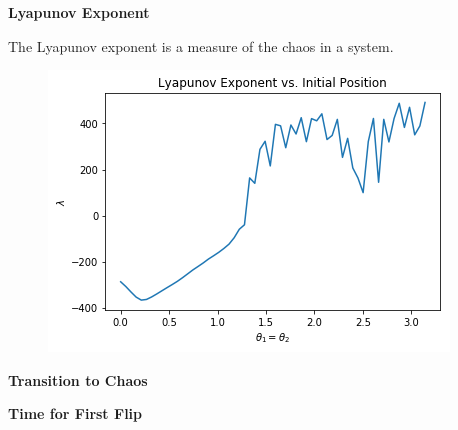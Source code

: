 \begin{problem}{2}
\textbf{Lyapunov Exponent}

The Lyapunov exponent is a measure of the chaos in a system.  

\begin{figure}[ht!]
	\centering
	\includegraphics[scale=0.6]{../figures/lyapunov.png}
	\caption{}
	\label{lyapunov}
\end{figure}

\end{problem}

\begin{problem}{3}
\textbf{Transition to Chaos}

\begin{figure}[ht!]
	\centering
	\caption{}
	\label{}
\end{figure}

\end{problem}

\begin{problem}{4}
\textbf{Time for First Flip}

\begin{figure}[ht!]
	\centering
	\caption{}
	\label{}
\end{figure}

\end{problem}